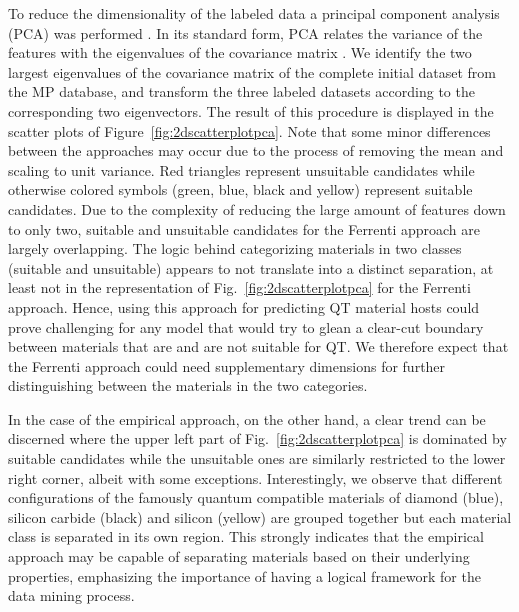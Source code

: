 \documentclass[superscriptaddress,
preprint,
 amsmath,amssymb,
 aps,
]{revtex4-2}
\begin{document}
To reduce the dimensionality of the labeled data a principal component analysis (PCA) was performed \cite{Jolliffe2002}. In its standard  form, PCA relates the variance of the features with the eigenvalues of the covariance matrix \cite{Jolliffe2002,Murphy2012,Hastie2009}. We identify the two largest eigenvalues of the covariance matrix \cite{Hastie2009} of the complete initial dataset from the MP database, and transform the three labeled datasets according to the corresponding two eigenvectors.
The result of this procedure is displayed in the scatter plots of Figure~\ref{fig:2dscatterplotpca}. Note that some minor differences between the approaches may occur due to the process of removing the mean and scaling to unit variance. Red triangles represent unsuitable candidates while otherwise colored symbols (green, blue, black and yellow) represent suitable candidates. 
Due to the complexity of reducing the large amount of features down to only two, suitable and unsuitable candidates for the Ferrenti approach are largely overlapping. 
The logic behind categorizing materials in two classes (suitable and unsuitable) appears to not translate into a distinct separation, at least not in the representation of Fig.~\ref{fig:2dscatterplotpca} for the Ferrenti approach.  
Hence, using this approach for predicting QT material hosts could prove challenging for any model that would try to glean a clear-cut boundary between materials that are and are not suitable for QT. 
We therefore expect that the Ferrenti approach could need supplementary dimensions for further distinguishing between the materials in the two categories. 

In the case of the empirical approach, on the other hand, a clear trend can be discerned where the upper left part of Fig.~\ref{fig:2dscatterplotpca} is dominated by suitable  %
candidates while the unsuitable ones are similarly restricted to the lower right corner, albeit with some exceptions. 
Interestingly, we observe that different configurations of the famously quantum compatible materials of diamond (blue), silicon carbide (black) and silicon (yellow) are grouped together but each material class is separated in its own region. 
This strongly indicates that the empirical approach may be capable of separating materials based on their underlying properties, emphasizing the importance of having a logical framework for the data mining process. %
\end{document}
